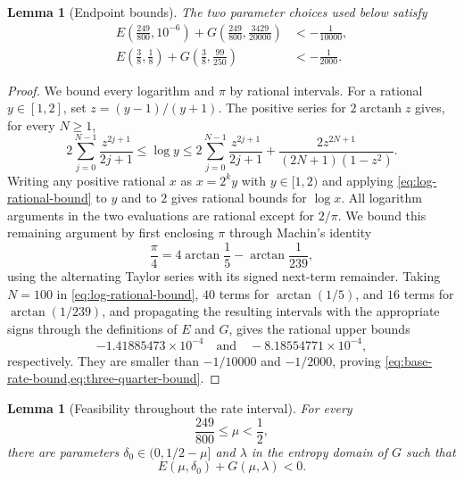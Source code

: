 \documentclass[11pt,letterpaper]{article}
\newtheorem{lemma}[theorem]{Lemma}
\theoremstyle{definition}
\begin{document}
\begin{lemma}[Endpoint bounds]
\label{lem:endpoint-bounds}
The two parameter choices used below satisfy
\begin{align}
 E\!\left(\frac{249}{800},10^{-6}\right)
 +G\!\left(\frac{249}{800},\frac{3429}{20000}\right)
 &< -\frac1{10000},
 \label{eq:base-rate-bound}\\
 E\!\left(\frac38,\frac18\right)
 +G\!\left(\frac38,\frac{99}{250}\right)
 &< -\frac1{2000}.
 \label{eq:three-quarter-bound}
\end{align}
\end{lemma}

\begin{proof}
We bound every logarithm and $\pi$ by rational intervals.  For a rational
$y\in[1,2]$, set $z=(y-1)/(y+1)$.  The positive series for
$2\operatorname{arctanh}z$ gives, for every $N\ge1$,
\begin{equation}
  2\sum_{j=0}^{N-1}\frac{z^{2j+1}}{2j+1}
  \le \log y
  \le
  2\sum_{j=0}^{N-1}\frac{z^{2j+1}}{2j+1}
  +\frac{2z^{2N+1}}{(2N+1)(1-z^2)}.
  \label{eq:log-rational-bound}
\end{equation}
Writing any positive rational $x$ as $x=2^k y$ with $y\in[1,2)$ and applying
\cref{eq:log-rational-bound} to $y$ and to $2$ gives rational bounds for
$\log x$.  All logarithm arguments in the two evaluations are rational except
for $2/\pi$.  We bound this remaining argument by first enclosing $\pi$ through
Machin's identity
\[
   \frac\pi4=4\arctan\frac15-\arctan\frac1{239},
\]
using the alternating Taylor series with its signed next-term remainder.
Taking $N=100$ in \cref{eq:log-rational-bound}, $40$ terms for
$\arctan(1/5)$, and $16$ terms for $\arctan(1/239)$, and propagating the
resulting intervals with the appropriate signs through the definitions of
$E$ and $G$, gives the rational upper bounds
\[
 -1.41885473\times10^{-4}
 \quad\text{and}\quad
 -8.18554771\times10^{-4},
\]
respectively.  They are smaller than $-1/10000$ and $-1/2000$, proving
\cref{eq:base-rate-bound,eq:three-quarter-bound}.
\end{proof}


\begin{lemma}[Feasibility throughout the rate interval]
\label{lem:global-feasibility}
For every
\[
   \frac{249}{800}\le \mu<\frac12,
\]
there are parameters $\delta_0\in(0,1/2-\mu]$ and $\lambda$ in the entropy domain of $G$ such that
\[
   E(\mu,\delta_0)+G(\mu,\lambda)<0.
\]
\end{lemma}
\end{document}
